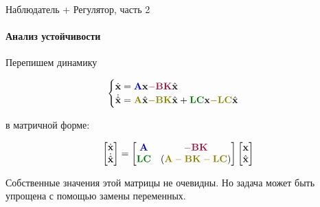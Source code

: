 \documentclass{beamer}
\begin{document}
\begin{frame}{Наблюдатель + Регулятор, часть 2}
	\framesubtitle{Анализ устойчивости}
	\begin{flushleft}
		
		Перепишем динамику
		
		\begin{equation}
			\begin{cases}
				\dot {\bo{x}} = \textcolor{mydarkblue}{\bo{A}} \bo{x} \textcolor{mydarkpink}{- \bo{B} \bo{K}} \hat{\bo{x}} 
				\\
				\dot{\hat{\bo{x}}} = \textcolor{myyellow}{\bo{A}} \hat{\bo{x}} \textcolor{myyellow}{- \bo{B} \bo{K}} \hat{\bo{x}} + \textcolor{mydarkgreen}{\bo{L}\bo{C}} \bo{x} \textcolor{myyellow}{- \bo{L}\bo{C}} \hat{\bo{x}}
			\end{cases}
		\end{equation}
		
		в матричной форме:
		
		\begin{equation}
			\begin{bmatrix}
				\dot {\bo{x}} \\
				\dot{\hat{\bo{x}}} 
			\end{bmatrix}
			=
			\begin{bmatrix}
				\textcolor{mydarkblue}{\bo{A}} & \textcolor{mydarkpink}{-\bo{B}\bo{K}}\\
				\textcolor{mydarkgreen}{\bo{L}\bo{C}} & (\textcolor{myyellow}{\bo{A} - \bo{B}\bo{K}-\bo{L}\bo{C}})
			\end{bmatrix}
			\begin{bmatrix}
				\bo{x} \\
				\hat{\bo{x}}
			\end{bmatrix}
		\end{equation}
		
		\bigskip
		
		Собственные значения этой матрицы не очевидны. Но задача может быть упрощена с помощью замены переменных.
		
	\end{flushleft}
\end{frame}
\end{document}
